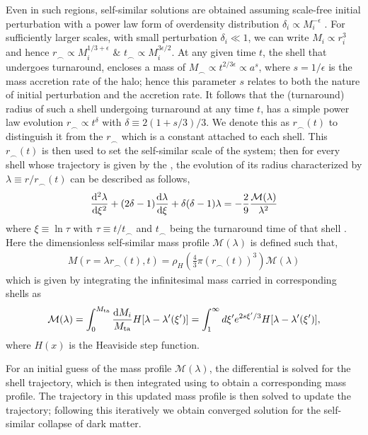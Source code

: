 Even in such regions, self-similar solutions are obtained assuming scale-free initial perturbation with a power law form of overdensity distribution $\delta_i \propto M_i^{-\epsilon}$ \cite{1984FillmoreGoldreich}. For sufficiently larger scales, with small perturbation $\delta_i \ll 1$, we can write $M_i \propto r_i^3$ and hence 
$r_{\smallfrown} \propto M_i^{1/3+\epsilon}$ \& $t_{\smallfrown} \propto M_i^{3\epsilon/2}$. At any given time $t$, the shell that undergoes turnaround, encloses a mass of $M_{\smallfrown} \propto t^{2/3\epsilon} \propto a^{s}$, where $s=1/\epsilon$ is the mass accretion rate of the halo; hence this parameter $s$ relates to both the nature of initial perturbation and the accretion rate. It follows that the (turnaround) radius of such a shell undergoing turnaround at any time $t$, has a simple power law evolution $r_{\smallfrown} \propto t^{\delta}$ with $\delta \equiv 2(1+s/3)/3$. We denote this as $r_{\smallfrown}(t)$ to distinguish it from the $r_{\smallfrown}$ which is a constant attached to each shell. This $r_{\smallfrown}(t)$ is then used to set the self-similar scale of the system; then for every shell whose trajectory is given by the , the evolution of its radius characterized by $\lambda \equiv r/r_{\smallfrown}(t)$ can be described as follows,
\begin{align}
\label{eq:traj_DM_selfsim}
\frac{{\rm d}^2 \lambda}{{\rm d} \xi^2} + (2 \delta - 1) \frac{{\rm d} \lambda}{{\rm d} \xi} + \delta ( \delta -1) \lambda = - \frac{2}{9} \frac{\mathcal{M}(\lambda)}{\lambda^2 }
\end{align}
where $\xi \equiv \ln \tau $ with $ \tau \equiv t/t_{\smallfrown}$ and $t_{\smallfrown}$ being the turnaround time of that shell \cite{1985Bertschinger,2016ShiICM}. 
Here the dimensionless self-similar mass profile $\mathcal{M}(\lambda)$ is defined such that,
\begin{align}
M(r=\lambda r_{\smallfrown}(t),t) = \rho_H \left( \frac{4}{3} \pi (r_{\smallfrown}(t))^3 \right) \mathcal{M}(\lambda) %
\end{align}
which is given by integrating the infinitesimal mass carried in corresponding shells as 
\begin{align}
\label{eq:mass_integ_DM}
\mathcal{M}(\lambda) = \int_{0}^{M_{\rm{ta}}} \frac{{\rm d} M_i}{M_{\rm{ta}}} H[\lambda - \lambda'(\xi')] = \int_{1}^{\infty} d \xi' e^{2s\xi'/3} H[\lambda - \lambda'(\xi')],
\end{align}
where $H(x)$ is the Heaviside step function.

For an initial guess of the mass profile $\mathcal{M}(\lambda)$, the differential  is solved for the shell trajectory, which is then integrated using  to obtain a corresponding mass profile. The trajectory in this updated mass profile is then solved to update the trajectory; following this iteratively we obtain converged solution for the self-similar collapse of dark matter.


